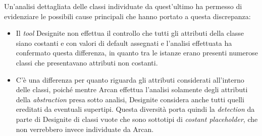         Un'analisi dettagliata delle classi individuate da quest'ultimo ha permesso di evidenziare le possibili cause principali che hanno portato a questa discrepanza:
        \begin{itemize}
            \item Il \textit{tool} Designite non effettua il controllo che tutti gli attributi della classe siano costanti e con valori di default assegnati e l'analisi effettuata ha confermato questa differenza, in quanto tra le istanze erano presenti numerose classi che presentavano attributi non costanti.
            
            \item C'è una differenza per quanto riguarda gli attributi considerati all'interno delle classi, poiché mentre Arcan effettua l'analisi solamente degli attributi della \textit{abstraction} presa sotto analisi, Designite considera anche tutti quelli ereditati da eventuali supertipi. Questa diversità porta quindi la \textit{detection} da parte di Designite di classi vuote che sono sottotipi di \textit{costant placeholder}, che non verrebbero invece individuate da Arcan.
        \end{itemize}
        
        
